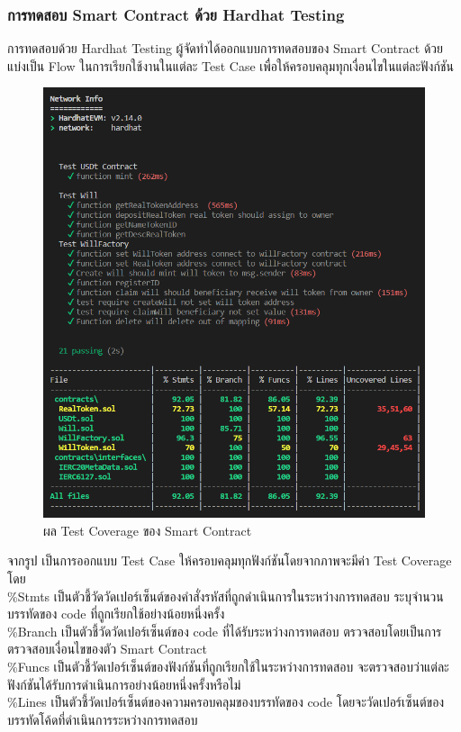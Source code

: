 \documentclass[12pt,oneside,openright,a4paper]{cpe-thai-project}
\begin{document}
\subsubsection { การทดสอบ Smart Contract ด้วย Hardhat Testing}
	\tab\tab การทดสอบด้วย Hardhat Testing ผู้จัดทำได้ออกแบบการทดสอบของ Smart Contract ด้วยแบ่งเป็น Flow ในการเรียกใช้งานในแต่ละ Test Case เพื่อให้ครอบคลุมทุกเงื่อนไขในแต่ละฟังก์ชัน
\begin{figure}[!thb]
			\centering
			\includegraphics[scale=0.5]{testCoverage}
			\caption{ผล Test Coverage ของ Smart Contract}
		\end{figure}
\FloatBarrier
\tab จากรูป เป็นการออกแบบ Test Case ให้ครอบคลุมทุกฟังก์ชันโดยจากภาพจะมีค่า Test Coverage โดย \\ \tab\%Stmts เป็นตัวชี้วัดวัดเปอร์เซ็นต์ของคำสั่งรหัสที่ถูกดำเนินการในระหว่างการทดสอบ ระบุจำนวนบรรทัดของ code ที่ถูกเรียกใช้อย่างน้อยหนึ่งครั้ง \\ \tab\%Branch เป็นตัวชี้วัดวัดเปอร์เซ็นต์ของ code ที่ได้รับระหว่างการทดสอบ ตรวจสอบโดยเป็นการตรวจสอบเงื่อนไขของตัว Smart Contract  \\ \tab\%Funcs เป็นตัวชี้วัดเปอร์เซ็นต์ของฟังก์ชันที่ถูกเรียกใช้ในระหว่างการทดสอบ จะตรวจสอบว่าแต่ละฟังก์ชันได้รับการดำเนินการอย่างน้อยหนึ่งครั้งหรือไม่  \\\tab\%Lines เป็นตัวชี้วัดเปอร์เซ็นต์ของความครอบคลุมของบรรทัดของ code โดยจะวัดเปอร์เซ็นต์ของบรรทัดโค้ดที่ดำเนินการระหว่างการทดสอบ
\end{document}
